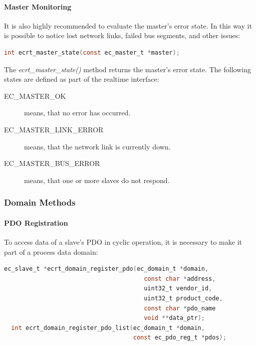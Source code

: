 \documentclass[a4paper,12pt,BCOR6mm,bibtotoc,idxtotoc]{scrbook}
\begin{document}
\paragraph{Master Monitoring}

It is also highly recommended to evaluate the master's error state. In
this way it is possible to notice lost network links, failed bus
segments, and other issues:

\begin{lstlisting}[language=C]
  int ecrt_master_state(const ec_master_t *master);
\end{lstlisting}

The \textit{ecrt\_master\_state()} method returns the master's error
state. The following states are defined as part of the realtime
interface:

\begin{description}
\item[EC\_MASTER\_OK] means, that no error has occurred.
\item[EC\_MASTER\_LINK\_ERROR] means, that the network link is
  currently down.
\item[EC\_MASTER\_BUS\_ERROR] means, that one or more slaves do not
  respond.
\end{description}

\subsubsection{Domain Methods}
\label{sec:ecrt-domain}

\paragraph{PDO Registration}

To access data of a slave's PDO in cyclic operation, it is necessary
to make it part of a process data domain:

\begin{lstlisting}[language=C]
  ec_slave_t *ecrt_domain_register_pdo(ec_domain_t *domain,
                                       const char *address,
                                       uint32_t vendor_id,
                                       uint32_t product_code,
                                       const char *pdo_name
                                       void **data_ptr);
  int ecrt_domain_register_pdo_list(ec_domain_t *domain,
                                    const ec_pdo_reg_t *pdos);
\end{lstlisting}
\end{document}
